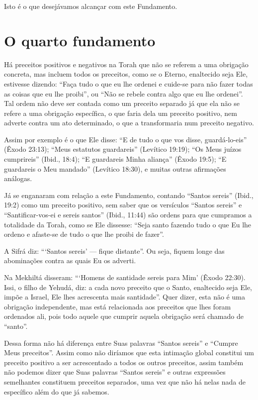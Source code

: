 Isto é o que desejávamos alcançar com este Fundamento.

\chapter*{O quarto fundamento}

Há preceitos positivos e negativos na Torah que não se referem a uma
obrigação concreta, mas incluem todos os preceitos, como se o Eterno,
enaltecido seja Ele, estivesse dizendo: ``Faça tudo o que eu lhe ordenei
e cuide-se para não fazer todas as coisas que eu lhe proibi'', ou ``Não
se rebele contra algo que eu lhe ordenei''. Tal ordem não deve ser
contada como um preceito separado já que ela não se refere a uma
obrigação específica, o que faria dela um preceito positivo, nem adverte
contra um ato determinado, o que a transformaria num preceito negativo.

Assim por exemplo é o que Ele disse: ``E de tudo o que vos disse,
guardá-lo-eis'' (Êxodo 23:13); ``Meus estatutos guardareis'' (Levítico
19:19); ``Os Meus juízos cumprireis'' (Ibid., 18:4); ``E guardareis
Minha aliança'' (Êxodo 19:5); ``E guardareis o Meu mandado'' (Levítico
18:30), e muitas outras afirmações análogas.

Já se enganaram com relação a este Fundamento, contando ``Santos
sereis'' (Ibid., 19:2) como um preceito positivo, sem saber que os
versículos
``Santos sereis'' e ``Santificar-vos-ei e sereis santos'' (Ibid., 11:44)
são ordens para que cumpramos a totalidade da Torah, como se Ele
dissesse: ``Seja santo fazendo tudo o que Eu lhe ordeno e afaste-se de
tudo o que lhe proibi de fazer''.

A Sifrá diz: ```Santos sereis' --- fique distante''. Ou seja, fiquem
longe das abominações contra as quais Eu os adverti.

Na Mekhiltá disseram: ```Homens de santidade sereis para Mim' (Êxodo
22:30). Issi, o filho de Yehudá, diz: a cada novo preceito que o Santo,
enaltecido seja Ele, impõe a Israel, Ele lhes acrescenta mais
santidade''. Quer dizer, esta não é uma obrigação independente, mas está
relacionada aos preceitos que lhes foram ordenados ali, pois todo aquele
que cumprir aquela obrigação será chamado de ``santo''.

Dessa forma não há diferença entre Suas palavras ``Santos sereis'' e
``Cumpre Meus preceitos''. Assim como não diríamos que esta intimação
global constitui um preceito positivo a ser acrescentado a todos os
outros preceitos, assim também não podemos dizer que Suas palavras
``Santos sereis'' e outras expressões semelhantes constituem preceitos
separados, uma vez que não há nelas nada de específico além do que já
sabemos.

